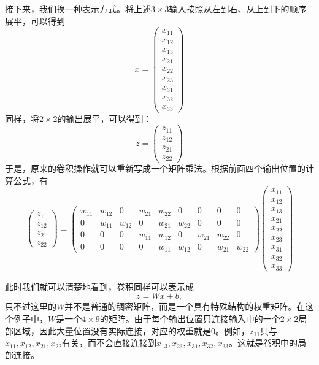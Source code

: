 接下来，我们换一种表示方式。将上述$3\times3$输入按照从左到右、从上到下的顺序展平，可以得到
$$
x=\begin{pmatrix}
x_{11}\\
x_{12}\\
x_{13}\\
x_{21}\\
x_{22}\\
x_{23}\\
x_{31}\\
x_{32}\\
x_{33}
\end{pmatrix}
$$
同样，将$2\times2$的输出展平，可以得到：
$$
z=\begin{pmatrix}
z_{11}\\
z_{12}\\
z_{21}\\
z_{22}
\end{pmatrix}
$$
于是，原来的卷积操作就可以重新写成一个矩阵乘法。根据前面四个输出位置的计算公式，有
$$
\begin{pmatrix}
z_{11}\\
z_{12}\\
z_{21}\\
z_{22}
\end{pmatrix}
=
\begin{pmatrix}
w_{11}&w_{12}&0&w_{21}&w_{22}&0&0&0&0\\
0&w_{11}&w_{12}&0&w_{21}&w_{22}&0&0&0\\
0&0&0&w_{11}&w_{12}&0&w_{21}&w_{22}&0\\
0&0&0&0&w_{11}&w_{12}&0&w_{21}&w_{22}
\end{pmatrix}
\begin{pmatrix}
x_{11}\\
x_{12}\\
x_{13}\\
x_{21}\\
x_{22}\\
x_{23}\\
x_{31}\\
x_{32}\\
x_{33}
\end{pmatrix}
$$

此时我们就可以清楚地看到，卷积同样可以表示成
$$
z=Wx+b,
$$
只不过这里的$W$并不是普通的稠密矩阵，而是一个具有特殊结构的权重矩阵。在这个例子中，$W$是一个$4\times9$的矩阵。由于每个输出位置只连接输入中的一个$2\times2$局部区域，因此大量位置没有实际连接，对应的权重就是$0$。例如，$z_{11}$只与$x_{11},x_{12},x_{21},x_{22}$有关，而不会直接连接到$x_{13},x_{23},x_{31},x_{32},x_{33}$。这就是卷积中的局部连接。

